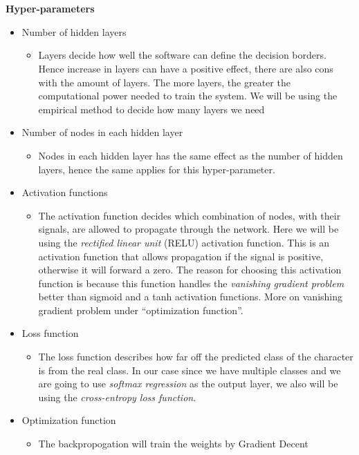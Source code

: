 \documentclass[11pt,a4paper,UKenglish]{article}
\begin{document}
\noindent \\
\noindent \\ \textbf{Hyper-parameters}
\begin{itemize}
 \item{Number of hidden layers}
 \begin{itemize}
  \item{Layers decide how well the software can define the decision borders.
  Hence increase in layers can have a positive effect, there are also cons with
  the amount of layers. The more layers, the greater the computational power
  needed to train the system. We will be using the empirical method to decide
  how many layers we need}
 \end{itemize}
 \item{Number of nodes in each hidden layer}
 \begin{itemize}
  \item{Nodes in each hidden layer has the same effect as the number of hidden
  layers, hence the same applies for this hyper-parameter. }
 \end{itemize}
 \item{Activation functions}
 \begin{itemize}
  \item{The activation function decides which combination of nodes, with their
  signals, are allowed to propagate through the network. Here we will be using
  the \textit{rectified linear unit} (RELU) activation function. This is an
  activation function that allows propagation if the signal is positive,
  otherwise it will forward a zero. The reason for choosing this activation
  function is because this function handles the \textit{vanishing gradient
  problem} better than sigmoid and a tanh activation functions. More on
  vanishing gradient problem under ``optimization function''.}
 \end{itemize}
 \item{Loss function}
 \begin{itemize}
  \item{The loss function describes how far off the predicted class of the
  character is from the real class. In our case since we have multiple
  classes and we are going to use \textit{softmax regression} as the output
  layer, we also will be using the \textit{cross-entropy loss function}.}
 \end{itemize}
 \item{Optimization function}
 \begin{itemize}
  \item{The backpropogation will train the weights by Gradient Decent
}
\end{itemize}
\end{itemize}
\end{document}

